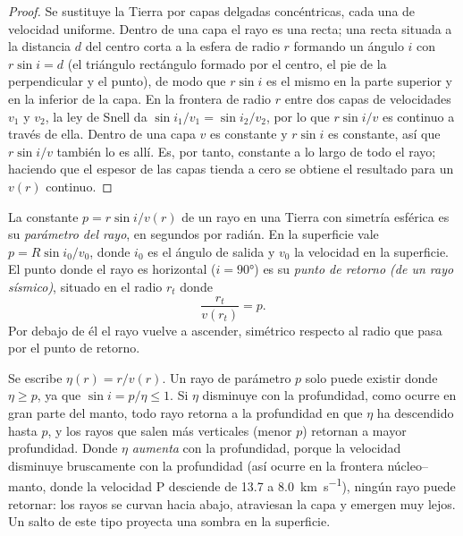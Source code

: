 \begin{proof}
Se sustituye la Tierra por capas delgadas concéntricas, cada una de velocidad uniforme. Dentro de una
capa el rayo es una recta; una recta situada a la distancia $d$ del
centro corta a la esfera de radio $r$ formando un ángulo $i$ con
$r\sin i = d$ (el triángulo rectángulo formado por el centro, el pie de la
perpendicular y el punto), de modo que $r\sin i$ es el mismo en la parte superior y en la
inferior de la capa. En la frontera de radio $r$ entre dos capas de
velocidades $v_1$ y $v_2$, la ley de Snell da $\sin i_1/v_1 = \sin i_2/v_2$, por lo que
$r\sin i/v$ es continuo a través de ella. Dentro de una capa $v$ es constante y
$r\sin i$ es constante, así que $r\sin i/v$ también lo es allí. Es, por tanto,
constante a lo largo de todo el rayo; haciendo que el espesor de las capas tienda a
cero se obtiene el resultado para un $v(r)$ continuo.
\end{proof}

\begin{definition}\label{def:b3:seismology-imaging:ray-parameter}
La constante $p = r\sin i/v(r)$ de un rayo en una Tierra con simetría esférica es
su \emph{parámetro del rayo}, en segundos por radián. En la
superficie vale $p = R\sin i_0/v_0$, donde $i_0$ es el ángulo de salida y $v_0$
la velocidad en la superficie. El punto donde el rayo es horizontal ($i = \ang{90}$)
es su \emph{punto de retorno (de un rayo sísmico)},
situado en el radio $r_t$ donde
\[
  \frac{r_t}{v(r_t)} = p .
\]
Por debajo de él el rayo vuelve a ascender, simétrico respecto al radio que pasa por el punto de
retorno.
\end{definition}

Se escribe $\eta(r) = r/v(r)$. Un rayo de parámetro $p$ solo puede existir donde
$\eta \ge p$, ya que $\sin i = p/\eta \le 1$. Si $\eta$ disminuye con la profundidad, como
ocurre en gran parte del manto, todo rayo retorna a la profundidad en que $\eta$
ha descendido hasta $p$, y los rayos que salen más verticales (menor $p$) retornan a mayor profundidad.
Donde $\eta$ \emph{aumenta} con la profundidad, porque la velocidad disminuye bruscamente con la
profundidad (así ocurre en la frontera núcleo--manto, donde la velocidad P desciende de
13.7 a \qty{8.0}{km.s^{-1}}), %
ningún rayo puede retornar: los rayos se curvan hacia abajo, atraviesan la capa y emergen muy lejos.
Un salto de este tipo proyecta una sombra en la superficie.

